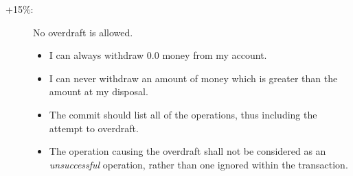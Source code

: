 \documentclass{article}
\begin{document}
\begin{itemize}
\begin{description}
			\item [+15\%: ] No overdraft is allowed.
			\begin{itemize}
				\item I can always withdraw $0.0$ money from my account.
				\item I can never withdraw an amount of money which is greater than the amount at my disposal.
				\item The commit should list all of the operations, thus including the attempt to overdraft.
				\item The operation causing the overdraft shall not be considered as an \textit{unsuccessful} operation, rather than one ignored within the transaction.
			\end{itemize}

%
%

\end{description}
\end{itemize}
\end{document}
